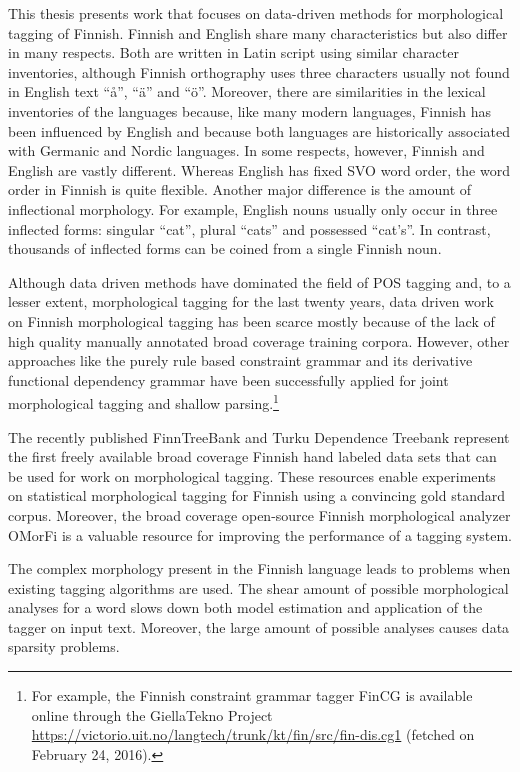 This thesis presents work that focuses on data-driven methods for
morphological tagging of Finnish. Finnish and English share many
characteristics but also differ in many respects. Both are written in
Latin script using similar character inventories, although Finnish
orthography uses three characters usually not found in English text
``å'', ``ä'' and ``ö''. Moreover, there are similarities in the
lexical inventories of the languages because, like many modern
languages, Finnish has been influenced by English and because both
languages are historically associated with Germanic and Nordic
languages. In some respects, however, Finnish and English are vastly
different. Whereas English has fixed SVO word order, the word order in
Finnish is quite flexible. Another major difference is the amount of
inflectional morphology. For example, English nouns usually only occur
in three inflected forms: singular ``cat'', plural ``cats'' and
possessed ``cat's''. In contrast, thousands of inflected forms can be
coined from a single Finnish noun.

Although data driven methods have dominated the field of POS tagging
and, to a lesser extent, morphological tagging for the last twenty
years, data driven work on Finnish morphological tagging has been
scarce mostly because of the lack of high quality manually annotated
broad coverage training corpora. However, other approaches like the
purely rule based constraint grammar \citep{Karlsson1995} and its
derivative functional dependency grammar \citep{Tapanainen1997} have
been successfully applied for joint morphological tagging and
shallow parsing.\footnote{For example, the Finnish constraint grammar
  tagger FinCG is available online through the GiellaTekno Project\\
  \url{https://victorio.uit.no/langtech/trunk/kt/fin/src/fin-dis.cg1}
  (fetched on February 24, 2016).}

The recently published FinnTreeBank \citep{Voutilainen2011} and Turku
Dependence Treebank \citep{Haverinen2013} represent the first freely
available broad coverage Finnish hand labeled data sets that can be
used for work on morphological tagging. These resources enable
experiments on statistical morphological tagging for Finnish using a
convincing gold standard corpus. Moreover, the broad coverage
open-source Finnish morphological analyzer OMorFi \citep{Pirinen2011}
is a valuable resource for improving the performance of a tagging
system.

The complex morphology present in the Finnish language leads to problems
when existing tagging algorithms are used. The shear amount of
possible morphological analyses for a word slows down both model
estimation and application of the tagger on input text. Moreover, the
large amount of possible analyses causes data sparsity
problems. %

